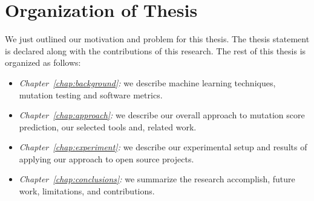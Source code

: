 \section{Organization of Thesis}
\label{sec:introduction_organization}
We just outlined our motivation and problem for this thesis. The thesis statement is declared along with the contributions of this research. The rest of this thesis is organized as follows:

\begin{itemize}
  \item \emph{Chapter~\ref{chap:background}:} we describe machine learning techniques, mutation testing and software metrics.
  \item \emph{Chapter~\ref{chap:approach}:} we describe our overall approach to mutation score prediction, our selected tools and, related work.
  \item \emph{Chapter~\ref{chap:experiment}:} we describe our experimental setup and results of applying our approach to open source projects.
  \item \emph{Chapter~\ref{chap:conclusions}:} we summarize the research accomplish, future work, limitations, and contributions.
\end{itemize}
